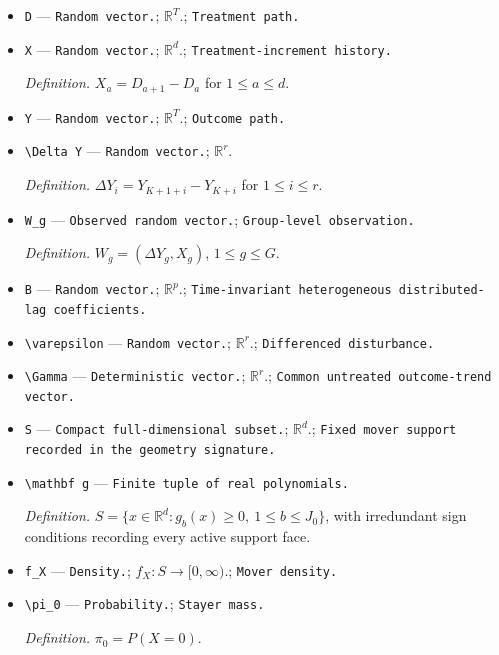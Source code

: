\documentclass{article}
\begin{document}
\begin{itemize}
  \item \texttt{D} --- \texttt{Random vector.}; \(\mathbb R^T\).; \texttt{Treatment path.}
  \item \texttt{X} --- \texttt{Random vector.}; \(\mathbb R^d\).; \texttt{Treatment-\allowbreak{}increment history.}
  \par\smallskip\noindent\emph{Definition.} \(X_a=D_{a+1}-D_a\) for \(1\le a\le d\).
  \item \texttt{Y} --- \texttt{Random vector.}; \(\mathbb R^T\).; \texttt{Outcome path.}
  \item \texttt{\textbackslash{}\allowbreak{}Delta Y} --- \texttt{Random vector.}; \(\mathbb R^r\).
  \par\smallskip\noindent\emph{Definition.} \(\Delta Y_i=Y_{K+1+i}-Y_{K+i}\) for \(1\le i\le r\).
  \item \texttt{W\_\allowbreak{}g} --- \texttt{Observed random vector.}; \texttt{Group-\allowbreak{}level observation.}
  \par\smallskip\noindent\emph{Definition.} \(W_g=(\Delta Y_g,X_g)\), \(1\le g\le G\).
  \item \texttt{B} --- \texttt{Random vector.}; \(\mathbb R^p\).; \texttt{Time-\allowbreak{}invariant heterogeneous distributed-\allowbreak{}lag coefficients.}
  \item \texttt{\textbackslash{}\allowbreak{}varepsilon} --- \texttt{Random vector.}; \(\mathbb R^r\).; \texttt{Differenced disturbance.}
  \item \texttt{\textbackslash{}\allowbreak{}Gamma} --- \texttt{Deterministic vector.}; \(\mathbb R^r\).; \texttt{Common untreated outcome-\allowbreak{}trend vector.}
  \item \texttt{S} --- \texttt{Compact full-\allowbreak{}dimensional subset.}; \(\mathbb R^d\).; \texttt{Fixed mover support recorded in the geometry signature.}
  \item \texttt{\textbackslash{}\allowbreak{}mathbf g} --- \texttt{Finite tuple of real polynomials.}
  \par\smallskip\noindent\emph{Definition.} \(S=\{x\in\mathbb R^d:g_b(x)\ge0,\ 1\le b\le J_0\}\), with irredundant sign conditions recording every active support face.
  \item \texttt{f\_\allowbreak{}X} --- \texttt{Density.}; \(f_X:S\to[0,\infty)\).; \texttt{Mover density.}
  \item \texttt{\textbackslash{}\allowbreak{}pi\_\allowbreak{}0} --- \texttt{Probability.}; \texttt{Stayer mass.}
  \par\smallskip\noindent\emph{Definition.} \(\pi_0=P(X=0)\).

\end{itemize}
\end{document}
